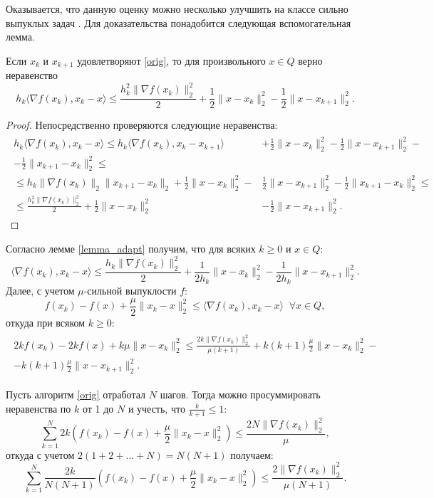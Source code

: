 Оказывается, что данную оценку можно несколько улучшить на классе сильно выпуклых задач \cite{Stonyakin_2021}. Для доказательства понадобится следующая вспомогательная лемма. 
\begin{lemma}\label{lemma_adapt}
Если $x_k$ и $x_{k+1}$ удовлетворяют \eqref{orig}, то для произвольного $x \in Q$ верно неравенство
$$
    h_k \langle \nabla f(x_k), x_k - x \rangle \leq \frac{h^2_k \|\nabla f(x_k)\|^2_2}{2} + \frac{1}{2}\| x - x_k\|^2_2 - \frac{1}{2}\| x -x_{k+1}\|^2_2.
$$
\end{lemma}
\begin{proof}
Непосредственно проверяются следующие неравенства:
\begin{gather*}
  \begin{aligned}
    h_k \langle \nabla f(x_k), x_k - x \rangle \leq h_k \langle \nabla f(x_k), x_k - x_{k+1} \rangle & + \frac{1}{2}\| x - x_k\|^2_2 -  \frac{1}{2}\| x - x_{k+1}\|^2_2 - \\
        - \frac{1}{2}\| x_{k+1} - x_k\|^2_2 \leq \\
    \leq h_k \|\nabla f(x_k)\|_2 \| x_{k+1} - x_{k} \|_2 + \frac{1}{2}\| x - x_k\|^2_2 -  &\frac{1}{2}\| x -x_{k+1}\|^2_2 - \frac{1}{2}\| x_{k+1} -x_k\|^2_2 \leq \\ 
    \leq \frac{h^2_k \|\nabla f(x_k)\|^2_2}{2} + \frac{1}{2}\| x - x_k\|^2_2& -  \frac{1}{2}\| x - x_{k+1}\|^2_2.
  \end{aligned}
\end{gather*}
\end{proof}
Согласно лемме \ref{lemma_adapt} получим, что для всяких $k \geq 0$ и $x \in Q$: 
$$
    \langle \nabla f(x_k), x_k - x \rangle \leq \frac{h_k \|\nabla f(x_k)\|^2_2}{2} + \frac{1}{2 h_k}\| x - x_k\|^2_2 - \frac{1}{2 h_k}\| x -x_{k+1}\|^2_2.
$$
Далее, с учетом $\mu$-сильной выпуклости $f$:
$$
    f(x_k) - f(x)  + \frac{\mu}{2}\|x_k - x \|^2_2 \leq \langle \nabla f(x_k), x_k - x \rangle \;\; \forall x \in Q,
$$
откуда при всяком $k \geq 0$:
\begin{gather*}
  \begin{aligned}
    2k f(x_k) - 2k f(x) + k\mu\|x - x_k \|^2_2 \leq \frac{2k\|\nabla f(x_k)\|^2_2}{\mu(k+1)} + k(k+1)\frac{\mu}{2}\|x - x_k\|^2_2 -\\
    - k(k+1)\frac{\mu}{2}\|x - x_{k+1}\|^2_2.
  \end{aligned}
\end{gather*}

Пусть алгоритм \eqref{orig} отработал $N$ шагов. Тогда можно просуммировать неравенства по $k$ от 1 до $N$ и учесть, что $\frac{k}{k+1} \leq 1$:
$$
    \sum_{k=1}^{N} 2k(f(x_k) - f(x) + \frac{\mu}{2} \| x_k - x \|^2_2) \leq \frac{2N\|\nabla f(x_k)\|^2_2}{\mu},
$$
откуда с учетом $2(1 + 2 +...+ N) = N(N + 1)$ получаем:
$$
    \sum_{k=1}^{N} \frac{2k}{N(N + 1)} (f(x_k) - f(x) + \frac{\mu}{2} \| x_k - x \|^2_2) \leq \frac{2\|\nabla f(x_k)\|^2_2}{\mu(N + 1)}.
$$

